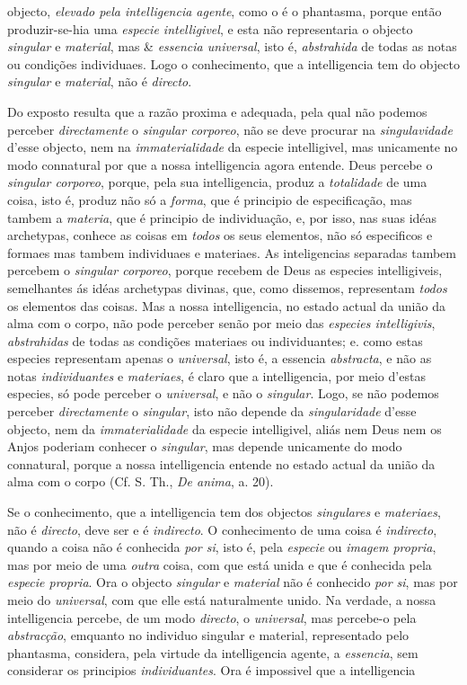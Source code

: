 objecto, \emph{elevado pela intelligencia agente}, como o é o phantasma, porque então produzir-se-hia uma \emph{especie intelligivel}, e esta não representaria o objecto \emph{singular} e \emph{material}, mas \& \emph{essencia universal}, isto é, \emph{abstrahida} de todas as notas ou condições individuaes. Logo o conhecimento, que a intelligencia tem do objecto \emph{singular} e \emph{material}, não é \emph{directo}.\par Do exposto resulta que a razão proxima e adequada, pela qual não podemos perceber \emph{directamente} o \emph{singular corporeo}, não se deve procurar na \emph{singulavidade} d'esse objecto, nem na \emph{immaterialidade} da especie intelligivel, mas unicamente no modo connatural por que a nossa intelligencia agora entende. Deus percebe o \emph{singular corporeo}, porque, pela sua intelligencia, produz a \emph{totalidade} de uma coisa, isto é, produz não só a \emph{forma}, que é principio de especificação, mas tambem a \emph{materia}, que é principio de individuação, e, por isso, nas suas idéas archetypas, conhece as coisas em \emph{todos} os seus elementos, não só especificos e formaes mas tambem individuaes e materiaes. As inteligencias separadas tambem percebem o \emph{singular corporeo}, porque recebem de Deus as especies intelligiveis, semelhantes ás idéas archetypas divinas, que, como dissemos, representam \emph{todos} os elementos das coisas. Mas a nossa intelligencia, no estado actual da união da alma com o corpo, não pode perceber senão por meio das \emph{especies intelligivis}, \emph{abstrahidas} de todas as condições materiaes ou individuantes; e. como estas especies representam apenas o \emph{universal}, isto é, a essencia \emph{abstracta}, e não as notas \emph{individuantes} e \emph{materiaes}, é claro que a intelligencia, por meio d'estas especies, só pode perceber o \emph{universal}, e não o \emph{singular}. Logo, se não podemos perceber \emph{directamente} o \emph{singular}, isto não depende da \emph{singularidade} d'esse objecto, nem da \emph{immaterialidade} da especie intelligivel, aliás nem Deus nem os Anjos poderiam conhecer o \emph{singular}, mas depende unicamente do modo connatural, porque a nossa intelligencia entende no estado actual da união da alma com o corpo (Cf. S. Th., \emph{De anima}, a. 20).\par Se o conhecimento, que a intelligencia tem dos objectos \emph{singulares} e \emph{materiaes}, não é \emph{directo}, deve ser e é \emph{indirecto}. O conhecimento de uma coisa é \emph{indirecto}, quando a coisa não é conhecida \emph{por si}, isto é, pela \emph{especie} ou \emph{imagem propria}, mas por meio de uma \emph{outra} coisa, com que está unida e que é conhecida pela \emph{especie propria}. Ora o objecto \emph{singular} e \emph{material} não é conhecido \emph{por si}, mas por meio do \emph{universal}, com que elle está naturalmente unido. Na verdade, a nossa intelligencia percebe, de um modo \emph{directo}, o \emph{universal}, mas percebe-o pela \emph{abstracção}, emquanto no individuo singular e material, representado pelo phantasma, considera, pela virtude da intelligencia agente, a \emph{essencia}, sem considerar os principios \emph{individuantes}. Ora é impossivel que a intelligencia 